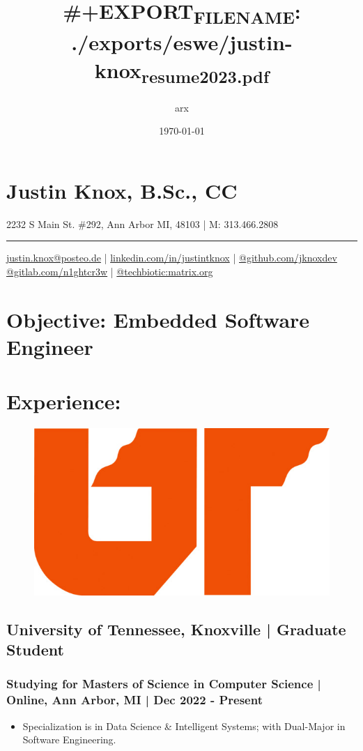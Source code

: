 \documentclass[letter,10pt]{article}
\author{arx}
\date{\today}
\title{\#+EXPORT\textsubscript{FILE}\textsubscript{NAME}: ./exports/eswe/justin-knox\textsubscript{resume}\textsubscript{2023.pdf}}
\begin{document}
\maketitle
\section*{Justin Knox, B.Sc., CC}
\label{sec:orge17034d}
2232 S Main St. \#292, Ann Arbor MI, 48103 | M: 313.466.2808

\noindent\rule{\textwidth}{0.5pt}
\href{mailto:justin.knox@posteo.de}{justin.knox@posteo.de} | \href{https://www.linkedin.com/in/justintknox}{linkedin.com/in/justintknox} | \href{https://www.github.com/jknoxdev}{@github.com/jknoxdev} \\
\href{https://gitlab.com/n1ghtcr3w}{@gitlab.com/n1ghtcr3w} | \href{https://matrix.to/\#/@techbiotic:matrix.org}{@techbiotic:matrix.org}


\section*{Objective:              Embedded Software Engineer}
\label{sec:orgd8e4bb1}
\section*{Experience:}
\label{sec:org667523c}
\begin{figure}
\includegraphics[width=0.45\linewidth]{./img/50p_cr_utk.jpg}
\end{figure}

\subsection*{University of Tennessee, Knoxville | Graduate Student}
\label{sec:org63622a7}
\subsubsection*{Studying for Masters of Science in Computer Science | Online, Ann Arbor, MI | Dec 2022 - Present}
\label{sec:orgc4c6045}
\begin{itemize}
\item Specialization is in Data Science \& Intelligent Systems; with Dual-Major in Software Engineering.
\end{itemize}
\end{document}
